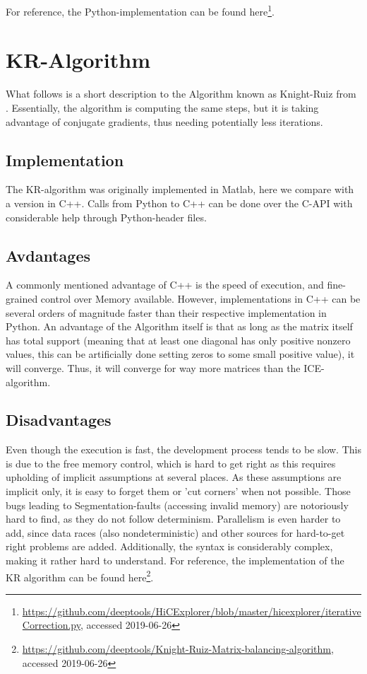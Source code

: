 For reference, the Python-implementation can be found
here\footnote{\url{https://github.com/deeptools/HiCExplorer/blob/master/hicexplorer/iterativeCorrection.py},
accessed 2019-06-26}.



\section{KR-Algorithm}\label{sec:KR}

What follows is a short description to the Algorithm known as Knight-Ruiz from
\cite{knight2013fast}. Essentially, the algorithm is computing the same steps,
but it is taking advantage of conjugate gradients, thus needing potentially
less iterations.

\subsection{Implementation}

The KR-algorithm was originally implemented in Matlab, here we compare with a
version in C++. Calls from Python to C++ can be done over the C-API with
considerable help through Python-header files.

\subsection{Avdantages}

A commonly mentioned advantage of C++ is the speed of execution, and
fine-grained control over Memory available. However, implementations in C++ can
be several orders of magnitude faster than their respective implementation in
Python. An advantage of the Algorithm itself is that as long as the matrix
itself has total support (meaning that at least one diagonal has only positive
nonzero values, this can be artificially done setting zeros to some small
positive value), it will converge. Thus, it will converge for way more matrices
than the ICE-algorithm.

\subsection{Disadvantages}

Even though the execution is fast, the development process tends to be slow.
This is due to the free memory control, which is hard to get right as this
requires upholding of implicit assumptions at several places. As these
assumptions are implicit only, it is easy to forget them or 'cut corners' when
not possible. Those bugs leading to Segmentation-faults (accessing invalid
memory) are notoriously hard to find, as they do not follow determinism.
Parallelism is even harder to add, since data races (also nondeterministic) and
other sources for hard-to-get right problems are added. Additionally, the
syntax is considerably complex, making it rather hard to understand.
For reference, the implementation of the KR algorithm can be found
here\footnote{\url{https://github.com/deeptools/Knight-Ruiz-Matrix-balancing-algorithm},
\\ accessed 2019-06-26}.

